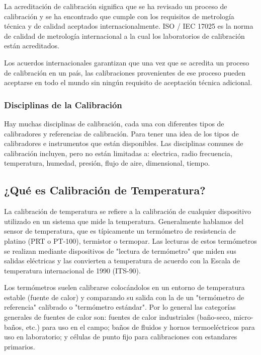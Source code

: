 		\par \noindent
			La acreditación de calibración significa que se ha revisado un proceso de calibración y se ha encontrado que cumple con los requisitos de metrología técnica y de calidad aceptados internacionalmente. ISO / IEC 17025 es la norma de calidad de metrología internacional a la cual los laboratorios de calibración están acreditados.
			
		\par \noindent
			Los acuerdos internacionales garantizan que una vez que se acredita un proceso de calibración en un país, las calibraciones provenientes de ese proceso pueden aceptarse en todo el mundo sin ningún requisito de aceptación técnica adicional.
			
\clearpage
\thispagestyle{plain}
		
	\subsubsection{Disciplinas de la Calibración}
		\par 
			Hay muchas disciplinas de calibración, cada una con diferentes tipos de calibradores y referencias de calibración. Para tener una idea de los tipos de calibradores e instrumentos que están disponibles. Las disciplinas comunes de calibración incluyen, pero no están limitadas a: electrica, radio frecuencia, temperatura, humedad, presión, flujo de aire, dimensional, tiempo.

\subsection{¿Qué es Calibración de Temperatura?}
	\par 
		La calibración de temperatura se refiere a la calibración de cualquier dispositivo utilizado en un sistema que mide la temperatura. Generalmente hablamos del sensor de temperatura, que es típicamente un termómetro de resistencia de platino (PRT o PT-100), termistor o termopar. Las lecturas de estos termómetros se realizan mediante dispositivos de "lectura de termómetro" que miden sus salidas eléctricas y las convierten a temperatura de acuerdo con la Escala de temperatura internacional de 1990 (ITS-90).
		
	\par \noindent
		Los termómetros suelen calibrarse colocándolos en un entorno de temperatura estable (fuente de calor) y comparando su salida con la de un "termómetro de referencia" calibrado o "termómetro estándar". Por lo general las categorías generales de fuentes de calor son: fuentes de calor industriales (baño-seco, micro-baños, etc.) para uso en el campo; baños de fluidos y hornos termoeléctricos para uso en laboratorio; y células de punto fijo para calibraciones con estandares primarios.
	

